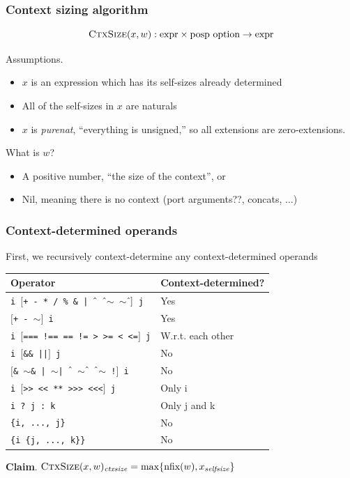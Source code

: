 \documentclass[mathserif]{beamer}
\newcommand{\Highlight}[1]{{\color{Highlight}#1}}
\newcommand{\ctxs}{\ensuremath{\textsc{CtxSize}}}
\begin{document}
\begin{frame}
\frametitle{Context sizing algorithm}

\[
\ctxs(x, w) : \textrm{expr} \times \textrm{posp option} \rightarrow \textrm{expr}
\]

Assumptions.
\begin{itemize}
\item $x$ is an expression which has its self-sizes already determined
\item All of the self-sizes in $x$ are naturals
\item $x$ is {\em purenat}, ``everything is unsigned,'' so all extensions
      are zero-extensions.
\end{itemize}

\bigskip
What is $w$?
\begin{itemize}
\item A positive number, ``the size of the context'', or
\item Nil, meaning there is no context (\Highlight{port arguments??}, concats, $\dots$)
\end{itemize}

\end{frame}



\begin{frame}
\frametitle{Context-determined operands}

First, we recursively context-determine any \Highlight{context-determined operands}

\bigskip

\begin{tabular}{ll}
{\bf Operator} & {\bf Context-determined?} \\
\hline
{\tt i $[$+ - * / \% \& | $\Hat{\ }$ $\Hat{\ }$$\sim$ $\sim$$\Hat{\ }]$ j} & Yes \\
{\tt $[$+ - $\sim]$ i} & Yes \\
{\tt i $[$=== !== == != > >= < <=$]$ j} & W.r.t. each other \\
{\tt i $[$\&\& ||$]$ j}                 & No \\
{\tt $[$\& $\sim$\& | $\sim$| $\Hat{\ }$ $\sim$$\Hat{\ }$ $\Hat{\ }$$\sim$ !$]$ i}  & No \\
{\tt i $[$>> << ** >>> <<<$]$ j} & Only i \\
{\tt i~?~j~:~k}                  & Only j and k \\
{\tt \{i, ..., j\}}              & No \\
{\tt \{i \{j, ..., k\}\}}        & No \\
\hline
\end{tabular}

\bigskip
{\bf Claim}. $\ctxs(x,w)_{\mathit{ctxsize}} = \max\{ \textrm{nfix}(w), x_{\mathit{selfsize}} \}$

\end{frame}
\end{document}
